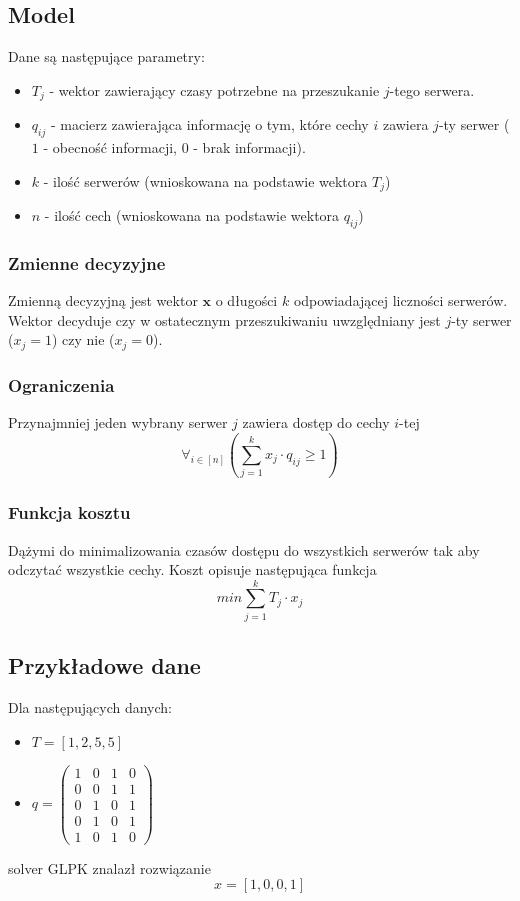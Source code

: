 \subsection{Model}
Dane są następujące parametry:
\begin{itemize}
    \item $T_j$ - wektor zawierający czasy potrzebne na przeszukanie $j$-tego serwera.
    \item $q_{ij}$ - macierz zawierająca informację o tym, które cechy $i$ zawiera $j$-ty serwer ($1$ - obecność informacji, $0$ - brak informacji).
    \item $k$ - ilość serwerów (wnioskowana na podstawie wektora $T_j$)
    \item $n$ - ilość cech (wnioskowana na podstawie wektora $q_{ij}$)
\end{itemize}

\subsubsection{Zmienne decyzyjne}
Zmienną decyzyjną jest wektor $\mathbf{x}$ o długości $k$ odpowiadającej liczności serwerów. Wektor decyduje czy w ostatecznym przeszukiwaniu uwzględniany jest $j$-ty serwer ($x_j = 1$) czy nie ($x_j = 0$).

\subsubsection{Ograniczenia}
Przynajmniej jeden wybrany serwer $j$ zawiera dostęp do cechy $i$-tej
$$ \forall_{i\in[n]} (\sum_{j=1}^{k} x_j \cdot q_{ij} \geq 1) $$

\subsubsection{Funkcja kosztu}
Dążymi do minimalizowania czasów dostępu do wszystkich serwerów tak aby odczytać wszystkie cechy. Koszt opisuje następująca funkcja
$$ \textit{min}\sum_{j=1}^{k} T_j \cdot x_j $$

\subsection{Przykładowe dane}
Dla następujących danych:
\begin{itemize}
    \item $T = [1, 2, 5, 5]$
    \item $q = \left( \begin{matrix} 1 & 0 & 1 & 0 \\ 0 & 0 & 1 & 1 \\ 0 & 1 & 0 & 1 \\ 0 & 1 & 0 & 1 \\ 1 & 0 & 1 & 0 \end{matrix} \right) $
\end{itemize}

solver GLPK znalazł rozwiązanie
$$ x = [1,0,0,1] $$